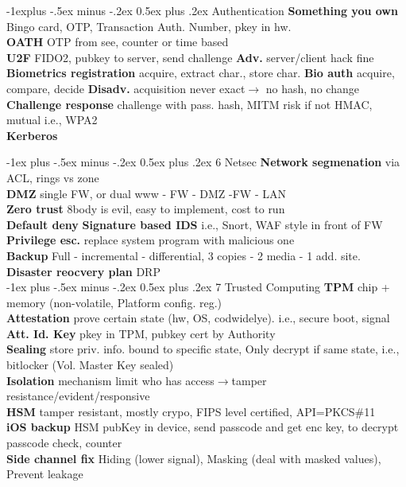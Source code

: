 \documentclass[10pt,landscape]{article}
\makeatletter
\renewcommand{\section}{\@startsection{section}{1}{0mm}%
                                {-1ex plus -.5ex minus -.2ex}%
                                {0.5ex plus .2ex}%
                                {\normalfont\large\bfseries}}
\renewcommand{\subsection}{\@startsection{subsection}{2}{0mm}%
                                {-1explus -.5ex minus -.2ex}%
                                {0.5ex plus .2ex}%
                                {\normalfont\normalsize\bfseries}}
\makeatother
\begin{document}
\begin{multicols*}{4}
\subsection{Authentication}
\textbf{Something you own} Bingo card, OTP, Transaction Auth. Number, pkey in hw.\\
\textbf{OATH} OTP from see, counter or time based\\
\textbf{U2F} FIDO2, pubkey to server, send challenge \textbf{Adv.} server/client hack fine\\
\textbf{Biometrics registration} acquire, extract char., store char.
\textbf{Bio auth} acquire, compare, decide
\textbf{Disadv.} acquisition never exact$\rightarrow$ no hash, no change\\
\textbf{Challenge response} challenge with pass. hash, MITM risk if not HMAC, mutual i.e., WPA2\\
\textbf{Kerberos}


\section{6 Netsec}
\textbf{Network segmenation} via ACL, rings vs zone\\
\textbf{DMZ} single FW, or dual www - FW - DMZ -FW - LAN\\
\textbf{Zero trust} 8body is evil, easy to implement, cost to run\\
\textbf{Default deny}
\textbf{Signature based IDS} i.e., Snort, WAF style in front of FW\\
\textbf{Privilege esc.} replace system program with malicious one\\
\textbf{Backup} Full - incremental - differential, 3 copies - 2 media - 1 add. site.\\
\textbf{Disaster reocvery plan} DRP\\

\section{7 Trusted Computing}
\textbf{TPM} chip + memory (non-volatile, Platform config. reg.)\\
\textbf{Attestation} prove certain state (hw, OS, codwidelye). i.e., secure boot, signal\\
\textbf{Att. Id. Key} pkey in TPM, pubkey cert by Authority\\
\textbf{Sealing} store priv. info. bound to specific state, Only decrypt if same state, i.e., bitlocker (Vol. Master Key sealed)\\
\textbf{Isolation} mechanism limit who has access$\rightarrow$tamper resistance/evident/responsive\\
\textbf{HSM} tamper resistant, mostly crypo, FIPS level certified, API=PKCS\#11\\
\textbf{iOS backup} HSM pubKey in device, send passcode and get enc key, to decrypt passcode check, counter\\
\textbf{Side channel fix} Hiding (lower signal), Masking (deal with masked values), Prevent leakage


\end{multicols*}
\end{document}
